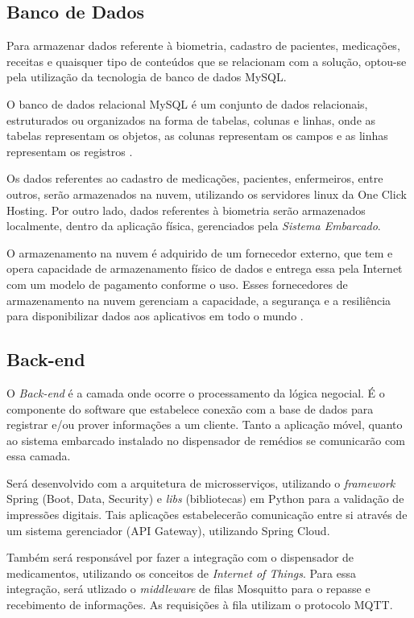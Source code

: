 \subsection{Banco de Dados}
Para armazenar dados referente à biometria, cadastro de pacientes, medicações, receitas e quaisquer tipo de conteúdos que se relacionam com a solução, optou-se pela utilização da tecnologia de banco de dados MySQL. 

O banco de dados relacional MySQL é um conjunto de dados relacionais, estruturados ou organizados na forma de tabelas, colunas e linhas, onde as tabelas representam os objetos, as colunas representam os campos e as linhas representam os registros \cite{EDUCBA_2020}.

Os dados referentes ao cadastro de medicações, pacientes, enfermeiros, entre outros, serão armazenados na nuvem, utilizando os servidores linux da One Click Hosting. Por outro lado, dados referentes à biometria serão armazenados localmente, dentro da aplicação física, gerenciados pela \emph{Sistema Embarcado}.

O armazenamento na nuvem é adquirido de um fornecedor externo, que tem e opera capacidade de armazenamento físico de dados e entrega essa pela Internet com um modelo de pagamento conforme o uso. Esses fornecedores de armazenamento na nuvem gerenciam a capacidade, a segurança e a resiliência para disponibilizar dados aos aplicativos em todo o mundo \cite{AMAZONWEBSERVICES_2020}.

\subsection{Back-end}
O \emph{Back-end} é a camada onde ocorre o processamento da lógica negocial. É o componente do software que estabelece conexão com a base de dados para registrar e/ou prover informações a um cliente. Tanto a aplicação móvel, quanto ao sistema embarcado instalado no dispensador de remédios se comunicarão com essa camada.

Será desenvolvido com a arquitetura de microsserviços, utilizando o \emph{framework} Spring (Boot, Data, Security) e \emph{libs} (bibliotecas) em Python para a validação de impressões digitais. 
Tais aplicações estabelecerão comunicação entre si através de um sistema gerenciador (API Gateway), utilizando Spring Cloud.

Também será responsável por fazer a integração com o dispensador de medicamentos, utilizando os conceitos de \emph{Internet of Things}. Para essa integração, será utlizado o \emph{middleware} de filas Mosquitto para o repasse e recebimento de informações. As requisições à fila utilizam o protocolo MQTT.


